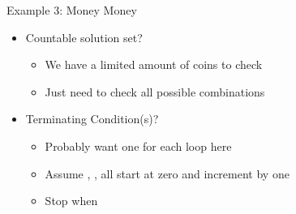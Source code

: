 \documentclass[pdf, aspectratio=169, 12pt]{beamer}
\begin{document}
\begin{frame}{Example 3: Money Money}
	\begin{itemize}
		\item Countable solution set?
			\begin{itemize}
				\item We have a limited amount of coins to check
				\item Just need to check all possible combinations
			\end{itemize}
		\item Terminating Condition(s)?
			\begin{itemize}
				\item Probably want one for each loop here
				\item Assume , ,  all start at zero and increment by one
				\item Stop when
					\begin{center}
						\\
						\\
					\end{center}
			\end{itemize}
	\end{itemize}
\end{frame}

			
	
\end{document}
